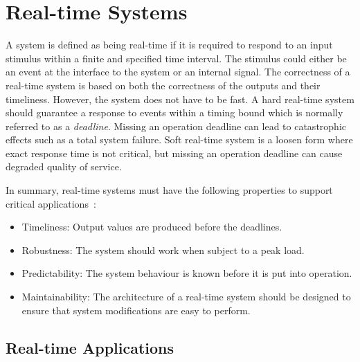 \section{Real-time Systems}
\label{sec:bg_realtime}

A system is defined as being real-time if it is required to respond to an input stimulus within a finite and specified time interval.
The stimulus could either be an event at the interface to the system or an internal signal.
The correctness of a real-time system is based on both the correctness of the outputs and their timeliness.
However, the system does not have to be fast.
A hard real-time system should guarantee a response to events within a timing bound which is normally referred to as a \textit{deadline}.
Missing an operation deadline can lead to catastrophic effects such as a total system failure. 
Soft real-time system is a loosen form where exact response time is not critical, but missing an operation deadline can cause degraded quality of service.

In summary, real-time systems must have the following properties to support critical applications~\cite{buttazzo11}:
\begin{itemize}
\item Timeliness: Output values are produced before the deadlines.
\item Robustness: The system should work when subject to a peak load.
\item Predictability: The system behaviour is known before it is put into operation.
\item Maintainability: The architecture of a real-time system should be designed to ensure that system modifications are easy to perform.
\end{itemize}

\subsection{Real-time Applications}

